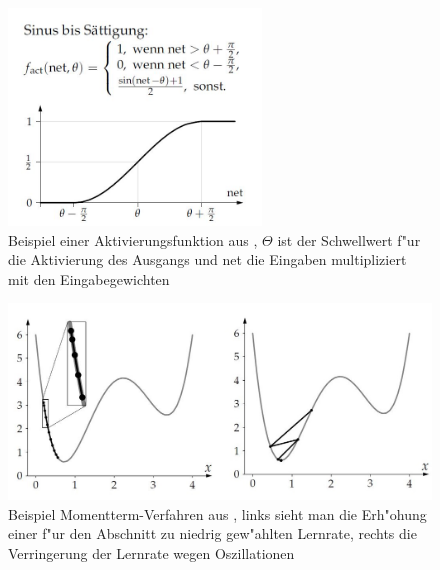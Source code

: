 \begin{figure}[h]
\includegraphics[width=0.6\textwidth]{1_Grafiken/fig2kruse.jpg}
	\caption[Beispiel einer Aktivierungsfunktion]{Beispiel einer Aktivierungsfunktion aus \cite{kruse2011computational}, $\Theta$ ist der Schwellwert f"ur die Aktivierung des Ausgangs und net die Eingaben multipliziert mit den Eingabegewichten}
\label{sinus}
\end{figure}

\begin{figure}[h]
\includegraphics[width=\textwidth]{1_Grafiken/fig3kruse.jpg}
	\caption[Beispiel f"ur Momentterm-Verfahren]{Beispiel Momentterm-Verfahren aus \cite{kruse2011computational}, links sieht man die Erh"ohung einer f"ur den Abschnitt zu niedrig gew"ahlten Lernrate, rechts die Verringerung der Lernrate wegen Oszillationen}
\label{momentum}
\end{figure}


